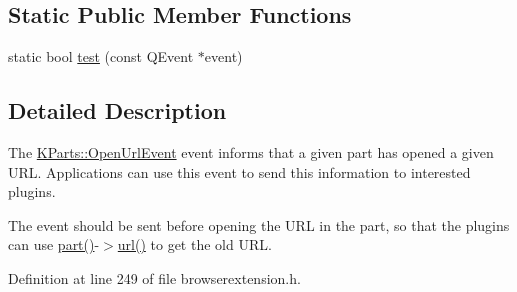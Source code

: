 \subsection*{Static Public Member Functions}
\begin{DoxyCompactItemize}
\item 
static bool \hyperlink{classKParts_1_1OpenUrlEvent_aa2c34fa11ddbcbf9828661fe681bcb62}{test} (const Q\+Event $\ast$event)
\end{DoxyCompactItemize}


\subsection{Detailed Description}
The \hyperlink{classKParts_1_1OpenUrlEvent}{K\+Parts\+::\+Open\+Url\+Event} event informs that a given part has opened a given U\+R\+L. Applications can use this event to send this information to interested plugins.

The event should be sent before opening the U\+R\+L in the part, so that the plugins can use \hyperlink{classKParts_1_1OpenUrlEvent_a2c23bcde7fee2966c25dbd7d961b151b}{part()}-\/$>$\hyperlink{classKParts_1_1OpenUrlEvent_a910c8c089b7c863e49cd83ddf4b8f003}{url()} to get the old U\+R\+L. 

Definition at line 249 of file browserextension.\+h.



